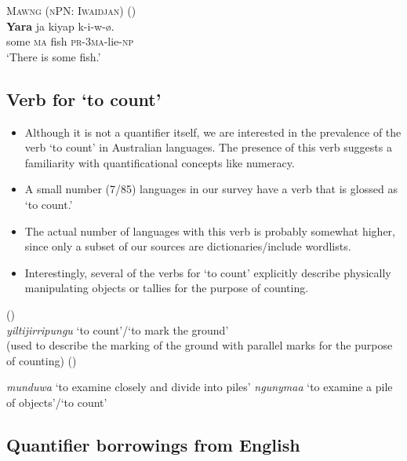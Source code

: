 \documentclass{article}
\makeatletter
\newcommand{\ofy}{/85} %
\makeatother
\begin{document}
\begin{exe}
  \ex\label{ex:dyara} \textsc{Mawng (nPN: Iwaidjan)} (\citealt{ngaralk})\\
  \gll \textbf{Yara} ja kiyap k-i-w-ø.\\
  some \textsc{ma} fish \textsc{pr-3ma}-lie-\textsc{np}\\
  \glt `There is some fish.' %
\end{exe}

\subsection{Verb for `to count'}

\begin{itemize}
\item Although it is not a quantifier itself, we are interested in the prevalence of the verb `to count' in Australian languages. The presence of this verb suggests a familiarity with quantificational concepts like numeracy.
\item A small number (7\ofy) languages in our survey have a verb that is glossed as `to count.'
\item The actual number of languages with this verb is probably somewhat higher, since only a subset of our sources are dictionaries/include wordlists.
\item Interestingly, several of the verbs for `to count' explicitly describe physically manipulating objects or tallies for the purpose of counting.
\end{itemize}

\begin{exe}
 (\citealt[179]{pintupi77})\\
\textit{yiltijirripungu} `to count'/`to mark the ground'\\
(used to describe the marking of the ground with parallel marks for the purpose of counting)
 (\citealt{heath84})
\begin{xlist}
\ex \textit{munduwa} `to examine closely and divide into piles' 
\ex \textit{ngunymaa} `to examine a pile of objects'/`to count'
\end{xlist}
\end{exe} 

\subsection{Quantifier borrowings from English}
\end{document}
